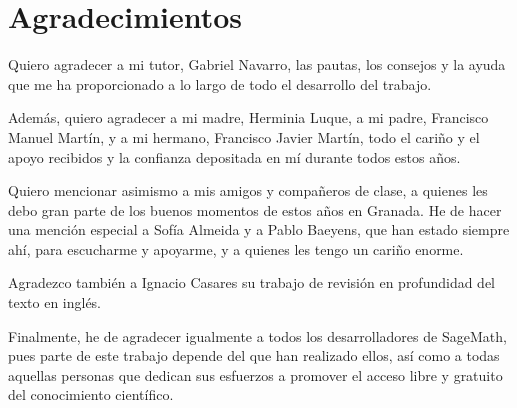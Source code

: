 
\begingroup
\let\clearpage\relax
\let\cleardoublepage\relax
\let\cleardoublepage\relax
\chapter*{Agradecimientos}
Quiero agradecer a mi tutor, Gabriel Navarro, las pautas, los consejos y la ayuda que me ha proporcionado a lo largo de todo el desarrollo del trabajo.

Además, quiero agradecer a mi madre, Herminia Luque, a mi padre, Francisco Manuel Martín, y a mi hermano, Francisco Javier Martín, todo el cariño y el apoyo recibidos y la confianza depositada en mí durante todos estos años.

Quiero mencionar asimismo a mis amigos y compañeros de clase, a quienes les debo gran parte de los buenos momentos de estos años en Granada.
He de hacer una mención especial a Sofía Almeida y a Pablo Baeyens, que han estado siempre ahí, para escucharme y apoyarme, y a quienes les tengo un cariño enorme.

Agradezco también a Ignacio Casares su trabajo de revisión en profundidad del texto en inglés.

Finalmente, he de agradecer igualmente a todos los desarrolladores de SageMath, pues parte de este trabajo depende del que han realizado ellos, así como a todas aquellas personas que dedican sus esfuerzos a promover el acceso libre y gratuito del conocimiento científico.



\endgroup